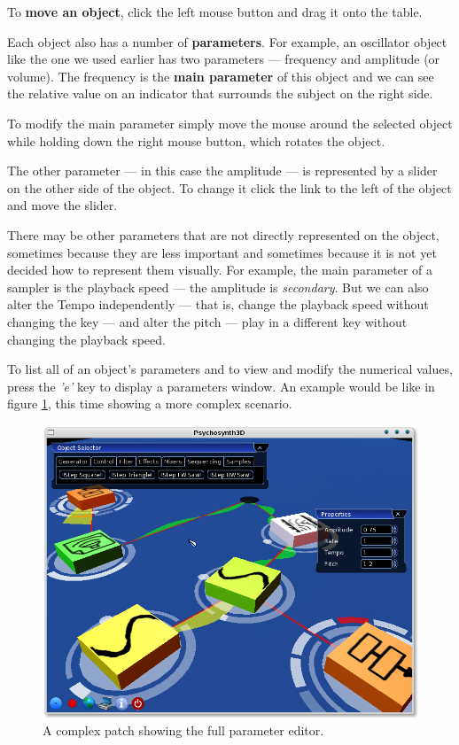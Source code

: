 To \textbf{move an object}, click the left mouse button and drag it
onto the table.

Each object also has a number of \textbf{parameters}. For example, an
oscillator object like the one we used earlier has two parameters ---
frequency and amplitude (or volume). The frequency is the \textbf{main
parameter} of this object and we can see the relative value on an
indicator that surrounds the subject on the right side.

To modify the main parameter simply move the mouse around the selected
object while holding down the right mouse button, which rotates the
object.

The other parameter --- in this case the amplitude --- is represented
by a slider on the other side of the object. To change it click the
link to the left of the object and move the slider.

There may be other parameters that are not directly represented on the
object, sometimes because they are less important and sometimes
because it is not yet decided how to represent them visually. For
example, the main parameter of a sampler is the playback speed --- the
amplitude is \emph{secondary}. But we can also alter the Tempo
independently --- that is, change the playback speed without changing
the key --- and alter the pitch --- play in a different key without
changing the playback speed.

To list all of an object's parameters and to view and modify the
numerical values, press the \emph{'e'} key to display a parameters
window. An example would be like in figure \ref{fig:userman-2}, this
time showing a more complex scenario.

\begin{figure}[h!]
  \centering
  \includegraphics[width=.7\textwidth]{pic/userman-2.png}
  \caption{A complex patch showing the full parameter editor.}
  \label{fig:userman-2}
\end{figure}

